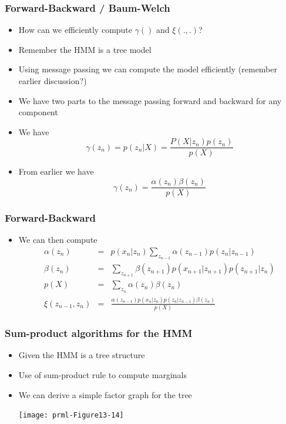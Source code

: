 \documentclass[10pt]{beamer}
\begin{document}
\begin{frame}
  \frametitle{Forward-Backward / Baum-Welch}
  \begin{itemize}
  \item How can we efficiently compute $\gamma()$ and $\xi(.,.)$?
  \item Remember the HMM is a tree model
  \item Using message passing we can compute the model efficiently
    (remember earlier discussion?)
  \item We have two parts to the message passing forward and backward
    for any component
  \item We have
    \[
    \gamma(z_n) = p(z_n|X) = \frac{P(X|z_n) p(z_n)}{p(X)}
    \]
  \item From earlier we have
    \[
    \gamma(z_n) = \frac{\alpha(z_n)\beta(z_n)}{p(X)}
    \]
  \end{itemize}
\end{frame}

\begin{frame}
  \frametitle{Forward-Backward}
  \begin{itemize}
  \item We can then compute
    \begin{eqnarray*}
      \alpha(z_n) &=& p(x_n|z_n)\sum_{z_{n-1}} \alpha(z_{n-1}) p(z_n|z_{n-1})\\
      \beta(z_n) &=& \sum_{z_{n+1}} \beta(z_{n+1}) p(x_{n+1}|z_{n+1})
      p(z_{n+1}|z_n)\\
      p(X) &=& \sum_{z_n} \alpha(z_n)\beta(z_n)\\
      \xi(z_{n-1}, z_n) &=& \frac{\alpha(z_{n-1})p(x_n|z_n)p(z_n|z_{n-1})\beta(z_n)}{p(X)}
    \end{eqnarray*}
  \end{itemize}
\end{frame}

\begin{frame}
  \frametitle{Sum-product algorithms for the HMM}
  \begin{itemize}
  \item Given the HMM is a tree structure
  \item Use of sum-product rule to compute marginals
  \item We can derive a simple factor graph for the tree
    \begin{center}
      \texttt{[image: prml-Figure13-14]}
    \end{center}
  \end{itemize}
\end{frame}
\end{document}
